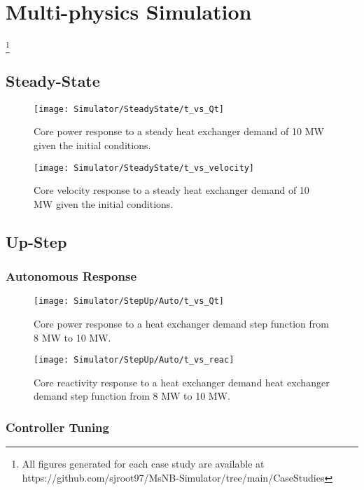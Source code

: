 \section{Multi-physics Simulation}\label{sec:simulation}
\footnote{All figures generated for each case study are available at https://github.com/sjroot97/MsNB-Simulator/tree/main/CaseStudies}
\subsection{Steady-State}

\begin{figure}[ht!]
    \centering
    \texttt{[image: Simulator/SteadyState/t\_vs\_Qt]}
    \caption[Steady state power response]{Core power response to a steady heat exchanger demand of 10 MW given the initial conditions.}
    \label{fig:SS-Power}
\end{figure}

\begin{figure}[ht!]
    \centering
    \texttt{[image: Simulator/SteadyState/t\_vs\_velocity]}
    \caption[Steady state velocity response]{Core velocity response to a steady heat exchanger demand of 10 MW given the initial conditions.}
    \label{fig:SS-Velocity}
\end{figure}
\clearpage
\subsection{Up-Step}

\subsubsection{Autonomous Response}
\begin{figure}[ht!]
    \centering
    \texttt{[image: Simulator/StepUp/Auto/t\_vs\_Qt]}
    \caption[Autonomous Up-Step Power Response]{Core power response to a heat exchanger demand step function from 8 MW to 10 MW.}
    \label{fig:Up-Power-Auto}
\end{figure}

\begin{figure}[ht!]
    \centering
    \texttt{[image: Simulator/StepUp/Auto/t\_vs\_reac]}
    \caption[Autonomous Up-Step Reactivity Response]{Core reactivity response to a heat exchanger demand heat exchanger demand step function from 8 MW to 10 MW.}
    \label{fig:Up-Reac-Auto}
\end{figure}
\clearpage
\subsubsection{Controller Tuning}


